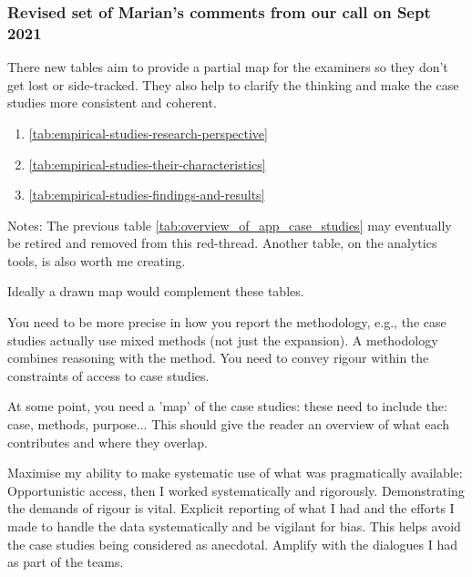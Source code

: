 \subsubsection{Revised set of Marian's comments from our call on  Sept 2021}


There new tables aim to provide a partial map for the examiners so they don't get lost or side-tracked. They also help to clarify the thinking and make the case studies more consistent and coherent.

\begin{enumerate}
    \item \ref{tab:empirical-studies-research-perspective} 
    \item \ref{tab:empirical-studies-their-characteristics} 
    \item \ref{tab:empirical-studies-findings-and-results} 
\end{enumerate}

Notes: The previous table \ref{tab:overview_of_app_case_studies}  may eventually be retired and removed from this red-thread. Another table, on the analytics tools, is also worth me creating.

Ideally a drawn map would complement these tables.


You need to be more precise in how you report the methodology, e.g., the case studies actually use mixed methods (not just the expansion). A methodology combines reasoning with the method. You need to convey rigour within the constraints of access to case studies.

At some point, you need a 'map' of the case studies:  these need to include the: case, methods, purpose...  This should give the reader an overview of what each contributes and where they overlap.


Maximise my ability to make systematic use of what was pragmatically available: Opportunistic access, then I worked systematically and rigorously. Demonstrating the demands of rigour is vital. Explicit reporting of what I had and the efforts I made to handle the data systematically and be vigilant for bias. This helps avoid the case studies being considered as anecdotal. Amplify with the dialogues I had as part of the teams.

